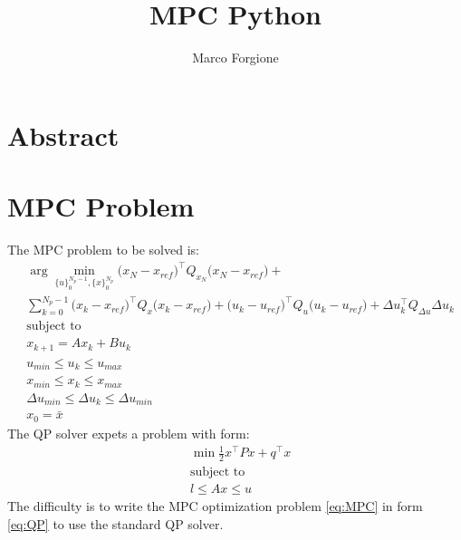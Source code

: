 \documentclass[a4paper,12pt,fleqn]{article}
\newcommand{\QxN}{Q_{x_N}}
\newcommand{\Qx}{Q_{x}}
\newcommand{\Qu}{Q_{u}}
\newcommand{\Qdu}{Q_{\Delta u}}
\newcommand{\Np}{N_p}
\begin{document}
 \title{MPC Python}
\author{Marco Forgione}

\maketitle

\section*{Abstract}

\section{MPC Problem}
The MPC problem to be solved is:
\begin{subequations}
\label{eq:MPC}
\begin{align}
  &\arg \min_{\{u\}_0^{\Np-1}, \{x\}_0^{\Np}} \big(x_N - x_{ref}\big)^\top \QxN \big(x_N - x_{ref}\big) + \nonumber \\  
  &\sum_{k=0}^{\Np-1} \big(x_k - x_{ref}\big)^\top \Qx\big(x_k - x_{ref}\big) + \big(u_k - u_{ref}\big)^\top \Qu \big(u_k - u_{ref}\big)  +  
  \Delta u_k^\top \Qdu \Delta u_k \\ \nonumber
  &\text{subject to} \nonumber\\
  &x_{k+1} = Ax_k + B u_k\\ 
  &u_{min} \leq u_k \leq u_{max}\\
  &x_{min} \leq x_k \leq x_{max}\\
  &\Delta u_{min} \leq \Delta u_k \leq \Delta u_{min}\\
  &x_0 = \bar x
\end{align}
\end{subequations}
The QP solver expets a problem with form: 
\begin{subequations}
\label{eq:QP}
\begin{align}
 &\min \frac{1}{2} x^\top P x +  q^\top x \\
 &\text{subject to} \nonumber \\
 &l \leq Ax \leq u
\end{align}
\end{subequations}
The difficulty is to write the MPC optimization problem \eqref{eq:MPC} in form
\eqref{eq:QP} to use the standard QP solver.
\end{document}
